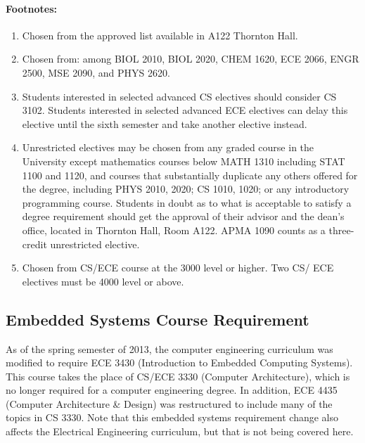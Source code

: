 \documentclass[10pt,letter]{book}
\newenvironment{numlist}{
\begin{enumerate}
\setlength{\itemsep}{0pt}
\setlength{\parskip}{0pt}}
{\end{enumerate}}
\begin{document}
\vspace{0.25in}

\paragraph{Footnotes:}

\begin{numlist}
\item Chosen from the approved list available in A122 Thornton Hall.
\item Chosen from: among BIOL 2010, BIOL 2020, CHEM 1620, ECE 2066, ENGR
  2500, MSE 2090, and PHYS 2620.
\item Students interested in selected advanced CS electives should
  consider CS 3102.  Students interested in selected advanced ECE
  electives can delay this elective until the sixth semester and take
  another elective instead.
\item Unrestricted electives may be chosen from any graded course in
  the University except mathematics courses below MATH 1310 including
  STAT 1100 and 1120, and courses that substantially duplicate any
  others offered for the degree, including PHYS 2010, 2020; CS 1010,
  1020; or any introductory programming course. Students in doubt as
  to what is acceptable to satisfy a degree requirement should get the
  approval of their advisor and the dean's office, located in Thornton
  Hall, Room A122. APMA 1090 counts as a three-credit unrestricted
  elective.
\item Chosen from CS/ECE course at the 3000 level or higher. Two
  CS/ ECE electives must be 4000 level or above.
\end{numlist}

\subsection{Embedded Systems Course Requirement}
\label{embedded}

As of the spring semester of 2013, the computer engineering curriculum
was modified to require ECE 3430 (Introduction to Embedded Computing
Systems).  This course takes the place of CS/ECE 3330 (Computer
Architecture), which is no longer required for a computer engineering
degree.  In addition, ECE 4435 (Computer Architecture \& Design) was
restructured to include many of the topics in CS 3330.  Note that this
embedded systems requirement change also affects the Electrical
Engineering curriculum, but that is not being covered here.
\end{document}
